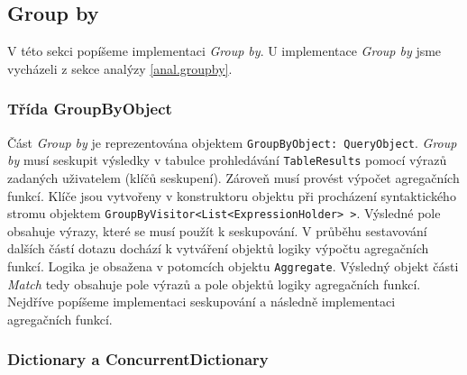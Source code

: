 \subsection{Group by}

V této sekci popíšeme implementaci \textit{Group by}.
U implementace \textit{Group by} jsme vycházeli z sekce analýzy \ref{anal.groupby}.

\subsubsection{Třída GroupByObject}

Část \textit{Group by} je reprezentována objektem \texttt{GroupByObject: QueryObject}.
\textit{Group by} musí seskupit výsledky v tabulce prohledávání \texttt{TableResults} pomocí výrazů zadaných uživatelem (klíčů seskupení).
Zároveň musí provést výpočet agregačních funkcí.
Klíče jsou vytvořeny v konstruktoru objektu při procházení syntaktického stromu objektem \texttt{GroupByVisitor<List<ExpressionHolder> >}.
Výsledné pole obsahuje výrazy, které se musí použít k seskupování.
V průběhu sestavování dalších částí dotazu dochází k vytváření objektů logiky výpočtu agregačních funkcí.
Logika je obsažena v potomcích objektu \texttt{Aggregate}.
Výsledný objekt části \textit{Match} tedy obsahuje pole výrazů a pole objektů logiky agregačních funkcí.
Nejdříve popíšeme implementaci seskupování a následně implementaci agregačních funkcí.

\subsubsection{Dictionary a ConcurrentDictionary}

